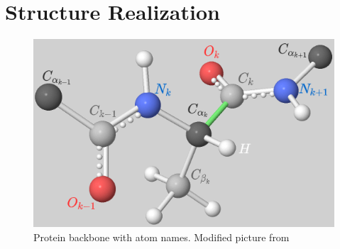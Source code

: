     
    
    



\section{Structure Realization}

\begin{figure}
    \centering
    \includegraphics[scale=0.5]{imgs_tomas/backbone.png}
    \caption{Protein backbone with atom names. Modified picture from \cite{ramachandran}}
    \label{fig:backbone}
\end{figure}

